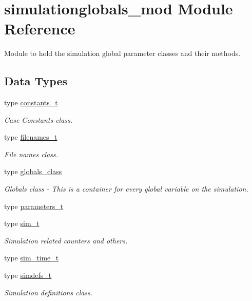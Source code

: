 \hypertarget{namespacesimulationglobals__mod}{}\section{simulationglobals\+\_\+mod Module Reference}
\label{namespacesimulationglobals__mod}


Module to hold the simulation global parameter classes and their methods.  


\subsection*{Data Types}
\begin{DoxyCompactItemize}
\item 
type \mbox{\hyperlink{structsimulationglobals__mod_1_1constants__t}{constants\+\_\+t}}
\begin{DoxyCompactList}\small\item\em Case Constants class. \end{DoxyCompactList}\item 
type \mbox{\hyperlink{structsimulationglobals__mod_1_1filenames__t}{filenames\+\_\+t}}
\begin{DoxyCompactList}\small\item\em File names class. \end{DoxyCompactList}\item 
type \mbox{\hyperlink{structsimulationglobals__mod_1_1globals__class}{globals\+\_\+class}}
\begin{DoxyCompactList}\small\item\em Globals class -\/ This is a container for every global variable on the simulation. \end{DoxyCompactList}\item 
type \mbox{\hyperlink{structsimulationglobals__mod_1_1parameters__t}{parameters\+\_\+t}}
\item 
type \mbox{\hyperlink{structsimulationglobals__mod_1_1sim__t}{sim\+\_\+t}}
\begin{DoxyCompactList}\small\item\em Simulation related counters and others. \end{DoxyCompactList}\item 
type \mbox{\hyperlink{structsimulationglobals__mod_1_1sim__time__t}{sim\+\_\+time\+\_\+t}}
\item 
type \mbox{\hyperlink{structsimulationglobals__mod_1_1simdefs__t}{simdefs\+\_\+t}}
\begin{DoxyCompactList}\small\item\em Simulation definitions class. \end{DoxyCompactList}\item 

\end{DoxyCompactItemize}
